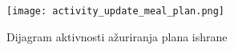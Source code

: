 \begin{figure}[H]
\begin{center}
\texttt{[image: activity\_update\_meal\_plan.png]}
\end{center}
    \caption{Dijagram aktivnosti ažuriranja plana ishrane}
\label{fig:ActivityUpdateMealPlan}
\end{figure}
